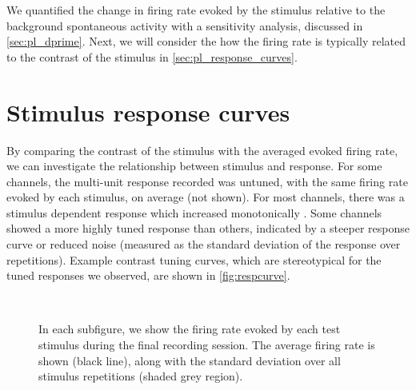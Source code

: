 We quantified the change in firing rate evoked by the stimulus relative to the background spontaneous activity with a sensitivity analysis, discussed in \autoref{sec:pl_dprime}.
Next, we will consider the how the firing rate is typically related to the contrast of the stimulus in \autoref{sec:pl_response_curves}.


\section{Stimulus response curves}
\label{sec:pl_response_curves}

By comparing the contrast of the stimulus with the averaged evoked firing rate, we can investigate the relationship between stimulus and response.
For some channels, the multi-unit response recorded was untuned, with the same firing rate evoked by each stimulus, on average (not shown).
For most channels, there was a stimulus dependent response which increased monotonically .
Some channels showed a more highly tuned response than others, indicated by a steeper response curve or reduced noise (measured as the standard deviation of the response over repetitions).
Example contrast tuning curves, which are stereotypical for the tuned responses we observed, are shown in \autoref{fig:respcurve}.


\begin{figure}[htbp]
    \centering
    \hspace*{\fill}
    \hspace{.4cm}
    \hspace*{\fill}
    \\
    \hspace*{\fill}
    \hspace{.4cm}
    \hspace*{\fill}
    \caption{
    In each subfigure, we show the firing rate evoked by each test stimulus during the final recording session.
    The average firing rate is shown (black line), along with the standard deviation over all stimulus repetitions (shaded grey region).
}
    \label{fig:respcurve}
\end{figure}
